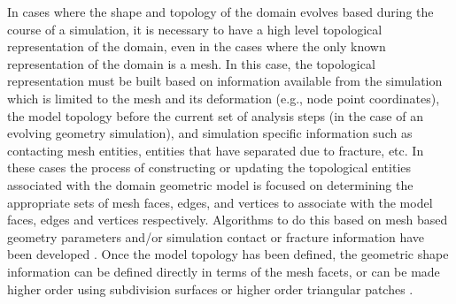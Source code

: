 \documentclass{article}
\begin{document}
In cases where the shape and topology of the domain evolves 
based during the course of a simulation, it is necessary to have 
a high level topological representation of the domain, even in 
the cases where the only known representation of the domain is 
a mesh. In this case, the topological representation must be 
built based on information available from the simulation which 
is limited to the mesh and its deformation (e.g., node point 
coordinates), the model topology before the current set of analysis 
steps (in the case of an evolving geometry simulation), and simulation 
specific information such as contacting mesh entities, entities 
that have separated due to fracture, etc. In these cases the 
process of constructing or updating the topological entities 
associated with the domain geometric model is focused on determining 
the appropriate sets of mesh faces, edges, and vertices to associate 
with the model faces, edges and vertices respectively. Algorithms 
to do this based on mesh based geometry parameters and/or simulation 
contact or fracture information have been developed \cite{r10, r11, 
r19}. Once the model topology has been defined, the geometric 
shape information can be defined directly in terms of the mesh 
facets, or can be made higher order using subdivision surfaces 
\cite{r5, r11} or higher order triangular patches \cite{r17,r18}.
\end{document}
